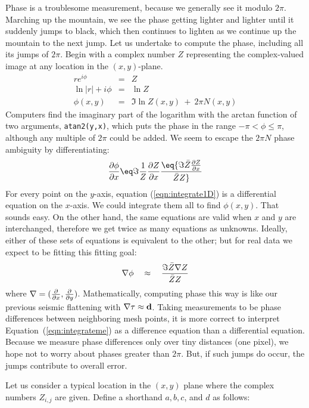 \par
Phase is a troublesome measurement, because
we generally see it modulo $2\pi$.
Marching up the mountain, we see the phase getting lighter and lighter
until it suddenly jumps to black, which then continues to lighten
as we continue up the mountain to the next jump.
Let us undertake to compute the phase, including
all its jumps of $2\pi$.
Begin with a complex number $Z$ representing
the complex-valued image at any location
in the $(x,y)$-plane.
\begin{eqnarray}
r e^{i \phi}   &=& Z \\
\ln |r| + i \phi &=& \ln Z \\
\phi(x,y)            &=&  \Im \ln Z(x,y) ~+~  2\pi N(x,y)
\end{eqnarray}
Computers find the imaginary part of the logarithm
with the arctan function of two arguments, {\tt atan2(y,x)},
which puts the phase in the range $-\pi < \phi \le \pi$,
although any multiple of $2\pi$ could be added.
We seem to escape the $2\pi N$ phase ambiguity by differentiating:
\begin{eqnarray}
{\partial\phi \over \partial x} \eq \Im {1 \over Z}{\partial Z \over \partial x} \eq
                                   {\Im  \bar Z {\partial Z \over \partial x} \over \bar Z Z }
\label{eqn:integrate1D}
\end{eqnarray}
For every point on the $y$-axis, equation (\ref{eqn:integrate1D})
is a differential equation on the $x$-axis.
We could integrate them all to find $\phi(x,y)$.
That sounds easy.
On the other hand,
the same equations are valid when $x$ and $y$ are interchanged,
therefore we get twice as many equations as unknowns.
Ideally, either of these sets of equations
is equivalent to the other;
but for real data we expect to be fitting this fitting goal:
\begin{equation}
\nabla \phi \quad \approx \quad {\Im  \bar Z \nabla Z \over \bar Z Z}
\label{eqn:integrateme}
\end{equation}
where
$\nabla = ({\partial \over \partial x}, {\partial \over \partial y} ) $.
Mathematically, computing phase this way
is like our previous seismic flattening with
$\nabla \tau \approx {\bf d}$.
Taking measurements to be phase differences 
between neighboring mesh points,
it is more correct to interpret Equation~(\ref{eqn:integrateme}) as 
a difference equation than a differential equation.
Because we measure phase differences only over tiny distances (one pixel),
we hope not to worry about phases greater than $2\pi$.
But, if such jumps do occur, the jumps contribute to overall error.
\par
Let us consider a typical location in the $(x , y )$ plane where the complex numbers
$Z_{i,j}$ are given. Define a shorthand $a , b, c$, and $d$ as follows: 

